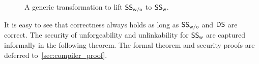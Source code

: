 \begin{figure}[!t]
    \begin{pchstack}
    \begin{pcvstack}
    \pcvspace
    \pcvspace

    \end{pcvstack}
    \pchspace
    \begin{pcvstack}
    \pcvspace
    \pcvspace
    \end{pcvstack}
    \end{pchstack}
\caption{\small A generic transformation to lift $\mathsf{SS}_\mathsf{w/o}$ to $\mathsf{SS}_\mathsf{w}$.}
\label{fig:ss-compiler}
\end{figure}

It is easy to see that correctness always holds as long as $\mathsf{SS}_\mathsf{w/o}$ and $\mathsf{DS}$ are correct. The security of unforgeability and unlinkability for $\mathsf{SS}_\mathsf{w}$ are captured informally in the following theorem. The formal theorem and security proofs are deferred to~\cref{sec:compiler_proof}.

